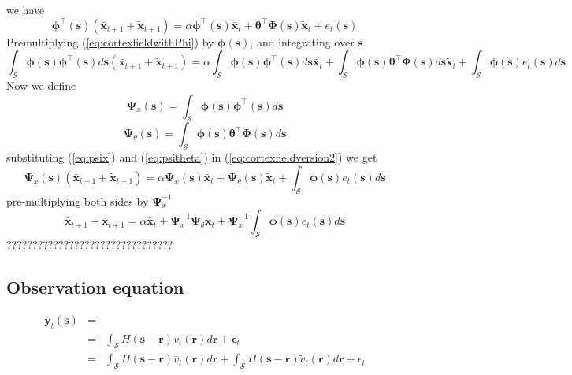 \documentclass[onecolumn,draftcls]{IEEEtran}
\begin{document}
we have
\begin{equation}
 \boldsymbol \phi^{\top}(\mathbf s)(\bar{\mathbf x}_{t+1}+\tilde{\mathbf x}_{t+1})=\alpha \boldsymbol\phi^{\top}(\mathbf s)\bar{\mathbf x}_{t}+\boldsymbol \theta^{\top}\boldsymbol\Phi(\mathbf s)\tilde{\mathbf x}_t+e_t(\mathbf s)
\label{eq:cortexfieldwithPhi}
\end{equation}
Premultiplying (\ref{eq:cortexfieldwithPhi}) by $\boldsymbol\phi(\mathbf s) $, and integrating over $\mathbf s$
\begin{equation}
\int_{\mathcal S} \boldsymbol\phi(\mathbf s)\boldsymbol \phi^{\top}(\mathbf s)d\mathbf s(\bar{\mathbf x}_{t+1}+\tilde{\mathbf x}_{t+1})=\alpha\int_{\mathcal S} \boldsymbol\phi(\mathbf s)\boldsymbol \phi^{\top}(\mathbf s)d\mathbf s \bar{\mathbf x}_{t}+\int_{\mathcal S} \boldsymbol\phi(\mathbf s)\boldsymbol \theta^{\top}\boldsymbol\Phi(\mathbf s)d\mathbf s\tilde{\mathbf x}_t+\int_{\mathcal S} \boldsymbol\phi(\mathbf s)e_t(\mathbf s)d\mathbf s
\label{eq:cortexfieldversion2}
\end{equation}
Now we define
\begin{equation}
 \boldsymbol\Psi_x(\mathbf s)=\int_{\mathcal S}\boldsymbol\phi(\mathbf s)\boldsymbol\phi^{\top}(\mathbf s)d\mathbf s
\label{eq:psix}
\end{equation}
\begin{equation}
  \boldsymbol\Psi_{\theta}(\mathbf s)=\int_{\mathcal S} \boldsymbol\phi(\mathbf s)\boldsymbol \theta^{\top}\boldsymbol\Phi(\mathbf s)d\mathbf s
\label{eq:psitheta}
\end{equation}
substituting (\ref{eq:psix}) and (\ref{eq:psitheta}) in (\ref{eq:cortexfieldversion2}) we get
\begin{equation}
\boldsymbol\Psi_x(\mathbf s)(\bar{\mathbf x}_{t+1}+\tilde{\mathbf x}_{t+1})=\alpha\boldsymbol\Psi_x(\mathbf s) \bar{\mathbf x}_{t}+\boldsymbol\Psi_{\theta}(\mathbf s)\tilde{\mathbf x}_t+\int_{\mathcal S} \boldsymbol\phi(\mathbf s)e_t(\mathbf s)d\mathbf s
\end{equation}
pre-multiplying both sides by $\boldsymbol\Psi_x^{-1}$
\begin{equation}
\bar{\mathbf x}_{t+1}+\tilde{\mathbf x}_{t+1}=\alpha\bar{\mathbf x}_{t}+\boldsymbol\Psi_x^{-1}\boldsymbol\Psi_{\theta}\tilde{\mathbf x}_t+\boldsymbol\Psi_x^{-1}\int_{\mathcal S} \boldsymbol\phi(\mathbf s)e_t(\mathbf s)d\mathbf s
\end{equation}
????????????????????????????????
\subsection{Observation equation}
\begin{eqnarray}
 \mathbf y_t(\mathbf s)&=&\\
&=&\int_{\mathcal S}H(\mathbf s-\mathbf r)v_t(\mathbf r)d\mathbf r+\boldsymbol\epsilon_t \\
&=&\int_{\mathcal S}H(\mathbf s-\mathbf r)\bar v_t(\mathbf r)d\mathbf r+\int_{\mathcal S}H(\mathbf s-\mathbf r)\tilde v_t(\mathbf r)d\mathbf r+\epsilon_t
\label{eq:observationequation}
\end{eqnarray}
\end{document}
